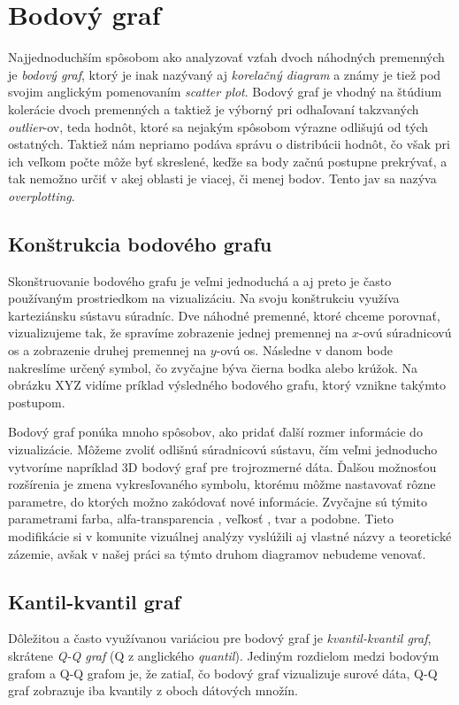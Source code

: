 \label{sec:prevvis}

\section{Bodový graf}
\label{subsec:scatterplot}
Najjednoduchším spôsobom ako analyzovať vzťah dvoch náhodných premenných je \textit{bodový graf}, ktorý je inak nazývaný aj \textit{korelačný diagram} a známy je tiež pod svojim anglickým pomenovaním \textit{scatter plot}. Bodový graf je vhodný na štúdium kolerácie dvoch premenných a taktiež je výborný pri odhaľovaní takzvaných \mbox{\textit{outlier}-ov}, teda hodnôt, ktoré sa nejakým spôsobom výrazne odlišujú od tých ostatných. Taktiež nám nepriamo podáva správu o distribúcii hodnôt, čo však pri ich veľkom počte môže byť skreslené, keďže sa body začnú postupne prekrývať, a tak nemožno určiť v akej oblasti je viacej, či menej bodov. Tento jav sa nazýva \textit{overplotting}.


\subsection{Konštrukcia bodového grafu}
Skonštruovanie bodového grafu je veľmi jednoduchá a aj preto je často používaným prostriedkom na vizualizáciu. Na svoju konštrukciu využíva karteziánsku sústavu súradníc. Dve náhodné premenné, ktoré chceme porovnať, vizualizujeme tak, že spravíme zobrazenie jednej premennej na \mbox{$ x $-ovú} súradnicovú os a zobrazenie druhej premennej na \mbox{$ y $-ovú} os. Následne v danom bode nakreslíme určený symbol, čo zvyčajne býva čierna bodka alebo krúžok. 
Na obrázku XYZ vidíme príklad výsledného bodového grafu, ktorý vznikne takýmto postupom.

Bodový graf ponúka mnoho spôsobov, ako pridať ďalší rozmer informácie do vizualizácie. Môžeme zvoliť odlišnú súradnicovú sústavu, čím veľmi jednoducho vytvoríme napríklad 3D bodový graf pre trojrozmerné dáta. Ďalšou možnosťou rozšírenia je zmena vykresľovaného symbolu, ktorému môžme nastavovať rôzne parametre, do ktorých možno zakódovať nové informácie. Zvyčajne sú týmito parametrami farba, \mbox{alfa-transparencia} \cite{SolutionToOverplotting}, veľkosť \cite{Viegas}, tvar \cite{GenSensScatterplot, EnhanceScatterplot} a podobne. Tieto modifikácie si v komunite vizuálnej analýzy vyslúžili aj vlastné názvy a teoretické zázemie, avšak v našej práci sa týmto druhom diagramov nebudeme venovať.

\subsection{Kantil-kvantil graf}
\label{subsec:qqplot}
Dôležitou a často využívanou variáciou pre bodový graf je \textit{kvantil-kvantil graf}, skrátene \textit{\mbox{Q-Q} graf} (Q z anglického \textit{quantil}). Jediným rozdielom medzi bodovým grafom a \mbox{Q-Q} grafom je, že zatiaľ, čo bodový graf vizualizuje surové dáta, \mbox{Q-Q} graf zobrazuje iba kvantily z oboch dátových množín. 

